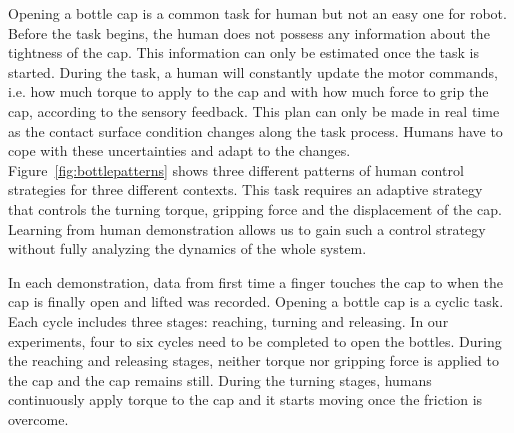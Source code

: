 
Opening a bottle cap is a common task for human but not an easy one
for robot. Before the task begins, the human does not possess any
information about the tightness of the cap. This information can only
be estimated once the task is started. During the task, a human will
constantly update the motor commands, i.e. how much torque to apply to
the cap and with how much force to grip the cap, according to the
sensory feedback. This plan can only be made in real time as the
contact surface condition changes along the task process. Humans have
to cope with these uncertainties and adapt to the
changes. Figure~\ref{fig:bottlepatterns} shows three different
patterns of human control strategies for three different
contexts. This task requires an adaptive strategy that controls the
turning torque, gripping force and the displacement of the
cap. Learning from human demonstration allows us to gain such a
control strategy without fully analyzing the dynamics of the whole
system. %


In each demonstration, data from first time a finger touches the cap
to when the cap is finally open and lifted was recorded. Opening a
bottle cap is a cyclic task. Each cycle includes three stages:
reaching, turning and releasing. In our experiments, four to six
cycles need to be completed to open the bottles. During the reaching
and releasing stages, neither torque nor gripping force is applied to the
cap and the cap remains still. During the turning stages, humans
continuously apply torque to the cap and it starts moving once the
friction is overcome.

